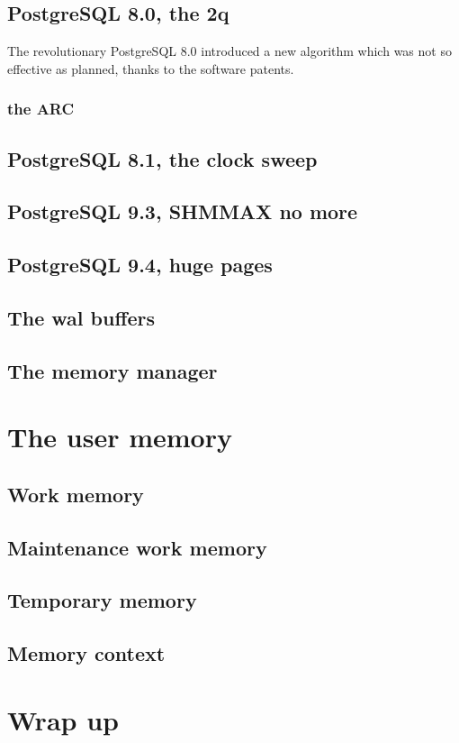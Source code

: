 \subsection{PostgreSQL 8.0, the 2q}
The revolutionary PostgreSQL 8.0 introduced a new algorithm which was not so effective as 
planned, thanks to the software patents. 

\subsubsection{the ARC}

\subsection{PostgreSQL 8.1, the clock sweep}

\subsection{PostgreSQL 9.3, SHMMAX no more}

\subsection{PostgreSQL 9.4, huge pages}


\subsection{The wal buffers}

\subsection{The memory manager}
\section{The user memory}
\subsection{Work memory}
\subsection{Maintenance work memory}
\subsection{Temporary memory}


\subsection{Memory context}

\section{Wrap up}